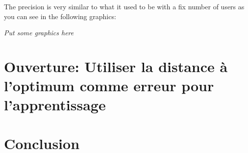 \documentclass[letterpaper]{article}
\begin{document}
The precision is very similar to what it used to be with a fix number of users as you can see in the following graphics:

\textit{Put some graphics here}

\section{Ouverture: Utiliser la distance à l'optimum comme erreur pour l'apprentissage}

\section{Conclusion}




\end{document}
